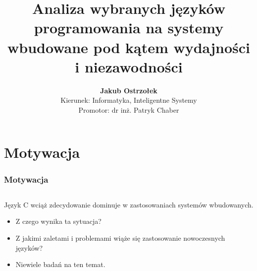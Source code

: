 \documentclass{beamer}
\title[Analiza języków dla systemów wbudowanych \insertframenumber/\inserttotalframenumber]{
	 Analiza wybranych języków programowania na systemy wbudowane pod
	 kątem wydajności i niezawodności
}
\author[Jakub Ostrzołek]{
 	\textbf{Jakub Ostrzołek} \\ \vspace{\smallskipamount}
	\scriptsize Kierunek: Informatyka, Inteligentne Systemy \\ \vspace{\bigskipamount}
  \footnotesize Promotor: dr inż. Patryk Chaber
}
\institute{
	Instytut Automatyki i Informatyki Stosowanej \\%
  Politechnika Warszawska
}
\let\olditem=\item
\renewcommand{\item}{\olditem \justifying}
\begin{document}
\frame{\titlepage}


\section{Motywacja}

\begin{frame}
	\frametitle{Motywacja}

	\begin{columns}
		\begin{column}{.60\textwidth}
			\justifying
			Język C wciąż zdecydowanie dominuje w zastosowaniach
			systemów wbudowanych.

			\begin{itemize}
				\item Z czego wynika ta sytuacja?
				\item Z jakimi zaletami i problemami wiąże się zastosowanie
				      nowoczesnych języków?
				\item Niewiele badań na ten temat.
			\end{itemize}


\end{column}
\end{columns}
\end{frame}
\end{document}
